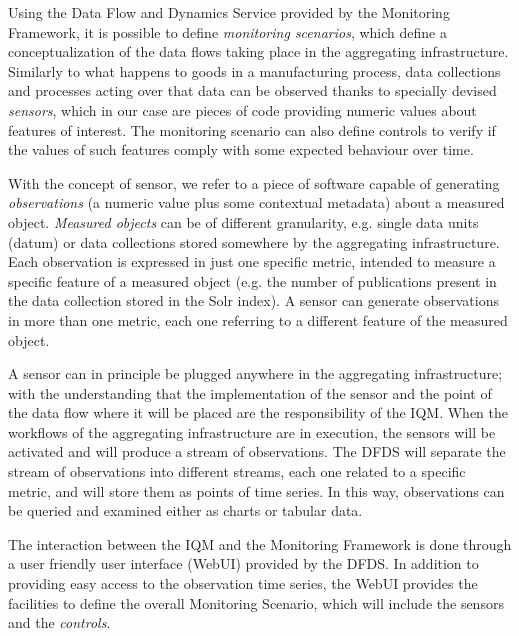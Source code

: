 \documentclass[amsthm,ebook]{saparticle}
\begin{document}
Using the Data Flow and Dynamics Service provided by the Monitoring Framework, it is possible to define \textit{monitoring scenarios}, which define a conceptualization of the data flows taking place in the aggregating infrastructure. Similarly to what happens to goods in a manufacturing process, data collections and processes acting over that data can be observed thanks to specially devised \textit{sensors}, which in our case are pieces of code providing numeric values about features of interest. The monitoring scenario can also define controls to verify if the values of such features comply with some expected behaviour over time.

With the concept of sensor, we refer to a piece of software capable of generating \textit{observations} (a numeric value plus some contextual metadata) about a measured object. \textit{Measured objects} can be of different granularity, e.g. single data units (datum) or data collections stored somewhere by the aggregating infrastructure. Each observation is expressed in just one specific metric, intended to measure a specific feature of a measured object (e.g. the number of publications present in the data collection stored in the Solr index). A sensor can generate observations in more than one metric, each one referring to a different feature of the measured object. 

A sensor can in principle be plugged anywhere in the aggregating infrastructure; with the understanding that the implementation of the sensor and the point of the data flow where it will be placed are the responsibility of the IQM. When the workflows of the aggregating infrastructure are in execution, the sensors will be activated and will produce a stream of observations. The DFDS will separate the stream of observations into different streams, each one related to a specific metric, and will store them as points of time series. In this way, observations can be queried and examined either as charts or tabular data.

The interaction between the IQM and the Monitoring Framework is done through a user friendly user interface (WebUI) provided by the DFDS. In addition to providing easy access to the observation time series, the WebUI provides the facilities to define the overall Monitoring Scenario, which will include the sensors and the \emph{controls}. 
\end{document}
